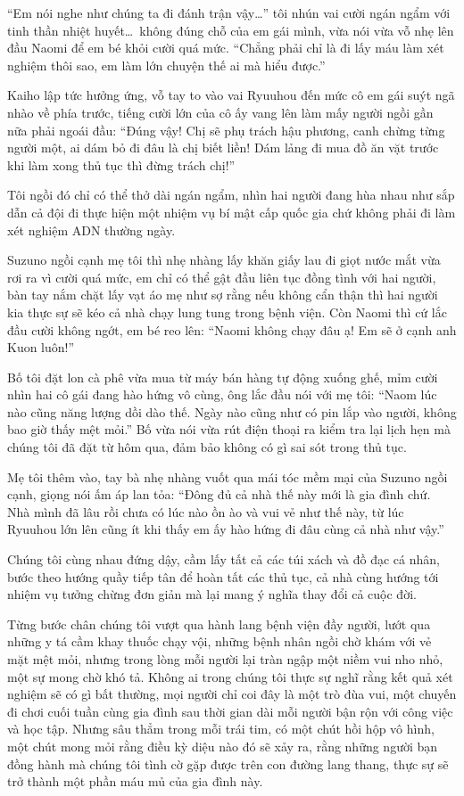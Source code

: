 ﻿\documentclass[../main.tex]{subfiles}
\begin{document}
``Em nói nghe như chúng ta đi đánh trận vậy\dots'' tôi nhún vai cười ngán ngẩm với tinh thần nhiệt huyết\dots\ không đúng chỗ của em gái mình, vừa nói vừa vỗ nhẹ lên đầu Naomi để em bé khỏi cười quá mức. ``Chẳng phải chỉ là đi lấy máu làm xét nghiệm thôi sao, em làm lớn chuyện thế ai mà hiểu được.''

Kaiho lập tức hưởng ứng, vỗ tay to vào vai Ryuuhou đến mức cô em gái suýt ngã nhào về phía trước, tiếng cười lớn của cô ấy vang lên làm mấy người ngồi gần nữa phải ngoái đầu: ``Đúng vậy! Chị sẽ phụ trách hậu phương, canh chừng từng người một, ai dám bỏ đi đâu là chị biết liền! Dám lảng đi mua đồ ăn vặt trước khi làm xong thủ tục thì đừng trách chị!''

Tôi ngồi đó chỉ có thể thở dài ngán ngẩm, nhìn hai người đang hùa nhau như sắp dẫn cả đội đi thực hiện một nhiệm vụ bí mật cấp quốc gia chứ không phải đi làm xét nghiệm ADN thường ngày.

Suzuno ngồi cạnh mẹ tôi thì nhẹ nhàng lấy khăn giấy lau đi giọt nước mắt vừa rơi ra vì cười quá mức, em chỉ có thể gật đầu liên tục đồng tình với hai người, bàn tay nắm chặt lấy vạt áo mẹ như sợ rằng nếu không cẩn thận thì hai người kia thực sự sẽ kéo cả nhà chạy lung tung trong bệnh viện. Còn Naomi thì cứ lắc đầu cười không ngớt, em bé reo lên: ``Naomi không chạy đâu ạ! Em sẽ ở cạnh anh Kuon luôn!''

Bố tôi đặt lon cà phê vừa mua từ máy bán hàng tự động xuống ghế, mỉm cười nhìn hai cô gái đang hào hứng vô cùng, ông lắc đầu nói với mẹ tôi: ``Naom lúc nào cũng năng lượng dồi dào thế. Ngày nào cũng như có pin lắp vào người, không bao giờ thấy mệt mỏi.'' Bố vừa nói vừa rút điện thoại ra kiểm tra lại lịch hẹn mà chúng tôi đã đặt từ hôm qua, đảm bảo không có gì sai sót trong thủ tục.

Mẹ tôi thêm vào, tay bà nhẹ nhàng vuốt qua mái tóc mềm mại của Suzuno ngồi cạnh, giọng nói ấm áp lan tỏa: ``Đông đủ cả nhà thế này mới là gia đình chứ. Nhà mình đã lâu rồi chưa có lúc nào ồn ào và vui vẻ như thế này, từ lúc Ryuuhou lớn lên cũng ít khi thấy em ấy hào hứng đi đâu cùng cả nhà như vậy.''

Chúng tôi cùng nhau đứng dậy, cầm lấy tất cả các túi xách và đồ đạc cá nhân, bước theo hướng quầy tiếp tân để hoàn tất các thủ tục, cả nhà cùng hướng tới nhiệm vụ tưởng chừng đơn giản mà lại mang ý nghĩa thay đổi cả cuộc đời.

Từng bước chân chúng tôi vượt qua hành lang bệnh viện đầy người, lướt qua những y tá cầm khay thuốc chạy vội, những bệnh nhân ngồi chờ khám với vẻ mặt mệt mỏi, nhưng trong lòng mỗi người lại tràn ngập một niềm vui nho nhỏ, một sự mong chờ khó tả. Không ai trong chúng tôi thực sự nghĩ rằng kết quả xét nghiệm sẽ có gì bất thường, mọi người chỉ coi đây là một trò đùa vui, một chuyến đi chơi cuối tuần cùng gia đình sau thời gian dài mỗi người bận rộn với công việc và học tập. Nhưng sâu thẳm trong mỗi trái tim, có một chút hồi hộp vô hình, một chút mong mỏi rằng điều kỳ diệu nào đó sẽ xảy ra, rằng những người bạn đồng hành mà chúng tôi tình cờ gặp được trên con đường lang thang, thực sự sẽ trở thành một phần máu mủ của gia đình này.
\end{document}
